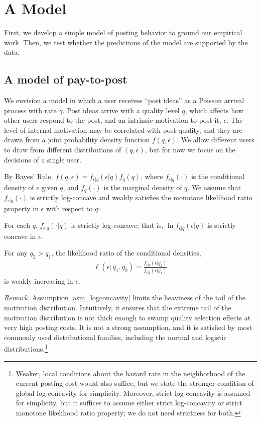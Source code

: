 \section{A Model}

First, we develop a simple model of posting behavior to ground our empirical work. Then, we test whether the predictions of the model are supported by the data.

\subsection{A model of pay-to-post}

We envision a model in which a user receives ``post ideas'' as a Poisson arrival process with rate $\gamma$. Post ideas arrive with a quality level $q$, which affects how other users respond to the post, and an intrinsic motivation to post it, $\epsilon$. The level of internal motivation may be correlated with post quality, and they are drawn from a joint probability density function $f(q,\epsilon)$. We allow different users to draw from different distributions of $(q,\epsilon)$, but for now we focus on the decisions of a single user.

By Bayes' Rule, $f(q, \epsilon) = f_{\epsilon|q} (\epsilon | q) f_q (q)$, where $f_{\epsilon|q}(\cdot)$ is the conditional density of $\epsilon$ given $q$, and $f_q(\cdot)$ is the marginal density of $q$. We assume that $f_{\epsilon|q}(\cdot)$ is strictly log-concave and weakly satisfies the monotone likelihood ratio property in $\epsilon$ with respect to $q$:

\begin{assumption}\label{asm_logconcavity}
For each $q$, $f_{\epsilon|q}(\cdot | q)$ is strictly log-concave; that is, $\ln f_{\epsilon|q} (\epsilon | q)$ is strictly concave in $\epsilon$.
\end{assumption}
\begin{assumption}\label{asm_mlrp}
For any $q_2 > q_1$, the likelihood ratio of the conditional densities,
\begin{align*}
\ell(\epsilon;q_1, q_2) = \frac{f_{\epsilon|q}(\epsilon|q_2)}{f_{\epsilon|q}(\epsilon|q_1)}
\end{align*}
is weakly increasing in $\epsilon$.
\end{assumption}
\noindent \emph{Remark.}  Assumption \ref{asm_logconcavity} limits the heaviness of the tail of the motivation distribution. Intuitively, it ensures that the extreme tail of the motivation distribution is not thick enough to swamp quality selection effects at very high posting costs. It is not a strong assumption, and it is satisfied by most commonly used distributional families, including the normal and logistic distributions.\footnote{Weaker, local conditions about the hazard rate in the neighborhood of the current posting cost would also suffice, but we state the stronger condition of global log-concavity for simplicity. Moreover, strict log-concavity is assumed for simplicity, but it suffices to assume either strict log-concavity or strict monotone likelihood ratio property; we do not need strictness for both.}

